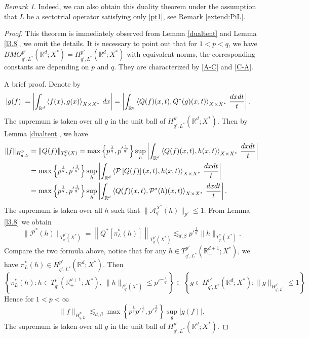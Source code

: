 \documentclass[oneside,english,a4wide]{amsart}
\numberwithin{equation}{section}
\numberwithin{figure}{section}
\theoremstyle{plain}
\theoremstyle{plain}
\theoremstyle{definition}
\theoremstyle{plain}
\theoremstyle{remark}
\theoremstyle{definition}
\theoremstyle{remark}
\newtheorem{remark}[thm]{Remark}
\theoremstyle{definition}
\newcommand{\real}{{\mathbb R}}
\newcommand{\A}{{\mathcal A}}
\newcommand{\8}{+\infty}
\renewcommand{\1}{\mathbbm{1}}
\newcommand\norm[1]{ \left\| #1 \right\| }
\newcommand\jdz[1]{ \left| #1 \right| }
\newcommand\mk[1]{ \left[ #1 \right] }
\newcommand\lk[1]{ \left\{ #1 \right\} }
\newcommand{\lara}[1]{\left\langle #1 \right\rangle}
\renewcommand\d{{\rm d}}
\begin{document}
{\begin{remark}
    Indeed, we can also obtain this duality theorem under the assumption that $L$ be a sectotrial operator satisfying only \eqref{pt1}, see Remark \ref{extend:PiL}.
\end{remark}

\iffalse
\begin{proof}
This theorem is immediately observed from Lemma \ref{dualtent} and Lemma \ref{l3.8}, we omit the details. It is necessary to point out that for $1 < p < q$, we have $BMO_{q', L^*}^{p'}(\real^d; X^*) = H^{p'}_{q', L^*}(\real^d; X^*)$ with equivalent norms, the corresponding constants are depending on $p$ and $q$. They are characterized by \eqref{A-C} and \eqref{C-A}. 

{\color{blue}A brief proof.
Denote by
\[
\begin{split}
    |g(f)| & = \jdz{ \int_{\real^d} \lara{ f(x), g(x) }_{X \times X^*} \,\d x } =  \jdz{ \int_{\real^d} \lara{ Q(f)(x, t), Q^*(g)(x, t) }_{X \times X^*} \,\frac{\d x\d t}{t} }. 
\end{split}    
\]
The supremum is taken over all $g$ in the unit ball of $H^{p'}_{q', L^*}(\real^d; X^*)$. Then by Lemma \ref{dualtent}, we have
\[
\begin{aligned}
    \| f \|_{H^p_{q, L}} & = \| Q(f) \|_{T^p_q(X)} = \max\lk{p^{\frac{1}{q}}, p'^{\frac{1}{q'}} } \sup_{h} \jdz{ \int_{\real^d} \lara{ Q(f)(x, t), h(x, t) }_{X \times X^*} \,\frac{\d x\d t}{t} } \\
    & = \max\lk{p^{\frac{1}{q}}, p'^{\frac{1}{q'}} } \sup_{h} \jdz{ \int_{\real^d} \lara{ \mathcal{P}\mk{Q(f)}(x, t), h(x, t) }_{X \times X^*} \,\frac{\d x\d t}{t} } \\
    & = \max\lk{p^{\frac{1}{q}}, p'^{\frac{1}{q'}} } \sup_{h} \jdz{ \int_{\real^d} \lara{ Q(f)(x, t), \mathcal{P}^*(h)(x, t) }_{X \times X^*} \,\frac{\d x\d t}{t} }. 
\end{aligned} 
\]
The supremum is taken over all $h$ such that $\| \A^{X^*}_{q'}(h) \|_{p'} \leq 1$. From Lemma \ref{l3.8} we obtain
\[
    \| \mathcal{P}^*(h) \|_{T^{p'}_{q'}(X^*)} = \norm{ Q^* \mk{ \pi_L^*(h) } }_{T^{p'}_{q'}(X^*)} \lesssim_{d, \beta} p'^{\frac{1}{q'}} \| h \|_{T^{p'}_{q'}(X^*)}.
\]
Compare the two formula above, notice that for any $h \in T^{p'}_{q', L^*}(\real^{d+1}_+; X^*)$, we have $\pi_L^*(h) \in H^{p'}_{q', L^*}(\real^d; X^*)$. Then
\[
    \lk{ \pi_L^*(h) : h \in T^{p'}_{q'}(\real^{d+1}_+; X^*),\ \| h \|_{T^{p'}_{q'}(X^*)} \leq p'^{-\frac{1}{q'}} } \subset \lk{ g \in H^{p'}_{q', L^*}(\real^d; X^*) : \| g \|_{H^{p'}_{q', L^*}} \leq 1 }
\]
Hence for $1 < p < \infty$
\[
    \| f \|_{H^p_{q, L}} \lesssim_{d, \beta}\max\lk{p^{\frac{1}{q}}p'^{\frac{1}{q'}}, p'^{\frac{2}{q'}} } \sup_{g}|g(f)|.
\]
The supremum is taken over all $g$ in the unit ball of $H^{p'}_{q', L^*}(\real^d; X^*)$.

}
\end{proof}}
\end{document}
